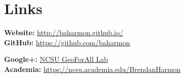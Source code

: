 \documentclass[]{baharmon_cv}
\begin{document}
{{{{{\sectiondivider


\section{Links} 
\begin{minipage}{0.45\textwidth} 
\textbf{Website:} \href{http://baharmon.github.io/}{http://baharmon.github.io/} \vspace{0.36em} \\ 
\textbf{GitHub:} \href{https://github.com/baharmon}{https://github.com/baharmon} %
\end{minipage} 
\begin{minipage}{0.45\textwidth} 
\textbf{Google+:}  \href{https://plus.google.com/u/0/b/112857255995703553144/112857255995703553144/}{NCSU GeoForAll Lab} \vspace{0.36em} \\
\textbf{Academia:} \href{https://ncsu.academia.edu/BrendanHarmon}{https://ncsu.academia.edu/BrendanHarmon}
\end{minipage} 


}}}}}
\end{document}
